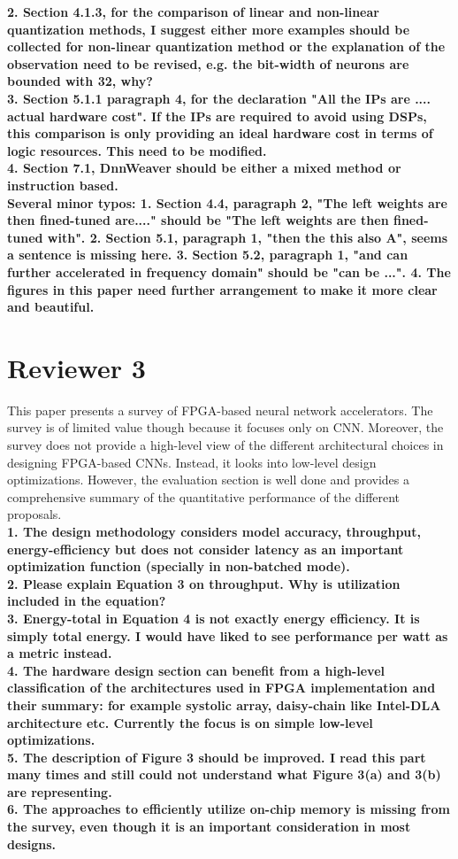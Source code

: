 \documentclass[12pt]{paper}
\newcommand{\reviewer}[1]{\section*{Reviewer #1}}
\newcommand{\comment}[1]{\noindent\textbf{#1}\\}
\begin{document}
\comment{2. Section 4.1.3, for the comparison of linear and non-linear quantization methods, I suggest either more examples should be collected for non-linear quantization method or the explanation of the observation need to be revised, e.g. the bit-width of neurons are bounded with 32, why?}

\comment{3.	Section 5.1.1 paragraph 4, for the declaration "All the IPs are .... actual hardware cost". If the IPs are required to avoid using DSPs, this comparison is only providing an ideal hardware cost in terms of logic resources. This need to be modified.}

\comment{4.	Section 7.1, DnnWeaver should be either a mixed method or instruction based.}

\comment{Several minor typos:
1. Section 4.4, paragraph 2, "The left weights are then fined-tuned are...." should be "The left weights are then fined-tuned with".
2. Section 5.1, paragraph 1, "then the this also A", seems a sentence is missing here.
3. Section 5.2, paragraph 1, "and can further accelerated in frequency domain" should be "can be ...".
4. The figures in this paper need further arrangement to make it more clear and beautiful.}

\reviewer{3}

This paper presents a survey of FPGA-based neural network accelerators. The survey is of limited value though because it focuses only on CNN. Moreover, the survey does not provide a high-level view of the different architectural choices in designing FPGA-based CNNs. Instead, it looks into low-level design optimizations. However, the evaluation section is well done and provides a comprehensive summary of the quantitative performance of the different proposals.\\

\comment{1.	The design methodology considers model accuracy, throughput, energy-efficiency but does not consider latency as an important optimization function (specially in non-batched mode).}

\comment{2.	Please explain Equation 3 on throughput. Why is utilization included in the equation?}

\comment{3.	Energy-total in Equation 4 is not exactly energy efficiency. It is simply total energy. I would have liked to see performance per watt as a metric instead.}

\comment{4.	The hardware design section can benefit from a high-level classification of the architectures used in FPGA implementation and their summary: for example systolic array, daisy-chain like Intel-DLA architecture etc. Currently the focus is on simple low-level optimizations.}

\comment{5.	The description of Figure 3 should be improved. I read this part many times and still could not understand what Figure 3(a) and 3(b) are representing.}

\comment{6.	The approaches to efficiently utilize on-chip memory is missing from the survey, even though it is an important consideration in most designs.}
\end{document}
